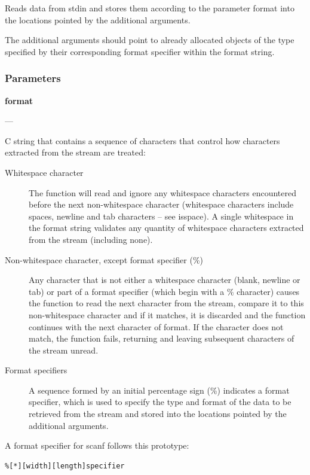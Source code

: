 \documentclass[10pt]{article}
\begin{document}
Reads data from stdin and stores them according to the parameter format into
the locations pointed by the additional arguments.

The additional arguments should point to already allocated objects of the type
specified by their corresponding format specifier within the format string.

\subsubsection{Parameters}

\textbf{format}

---

C string that contains a sequence of characters that control how characters
extracted from the stream are treated:

\begin{description}
    \item[Whitespace character] The function will read and ignore any whitespace
        characters encountered before the next non-whitespace character
        (whitespace characters include spaces, newline and tab characters -- see
        isspace). A single whitespace in the format string validates any
        quantity of whitespace characters extracted from the stream (including
        none).
    \item[Non-whitespace character, except format specifier (\%)] Any character
        that is not either a whitespace character (blank, newline or tab) or
        part of a format specifier (which begin with a \% character) causes the
        function to read the next character from the stream, compare it to this
        non-whitespace character and if it matches, it is discarded and the
        function continues with the next character of format. If the character
        does not match, the function fails, returning and leaving subsequent
        characters of the stream unread.
    \item[Format specifiers] A sequence formed by an initial percentage sign
        (\%) indicates a format specifier, which is used to specify the type and
        format of the data to be retrieved from the stream and stored into the
        locations pointed by the additional arguments.
\end{description}

A format specifier for scanf follows this prototype:

\begin{lstlisting}
%[*][width][length]specifier
\end{lstlisting}
\end{document}
